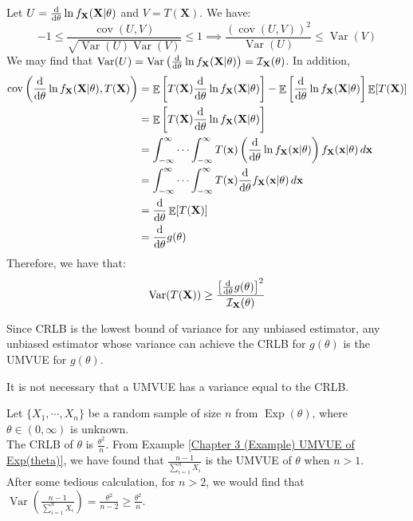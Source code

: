 \documentclass{huhtakm-template-book-v2}
\DeclareMathOperator{\E}{\mathbb{E}}
\DeclareMathOperator{\Var}{Var}
\DeclareMathOperator{\cov}{cov}
\DeclareMathOperator{\Exp}{Exp}
\begin{document}
\begin{proofing}
	Let $U=\odv*{\ln{f_{\mathbf{X}}(\mathbf{X}|\theta)}}{\theta}$ and $V=T(\mathbf{X})$. We have:
	\begin{equation*}
		-1\leq\frac{\cov(U,V)}{\sqrt{\Var(U)\Var(V)}}\leq 1\implies\frac{(\cov(U,V))^{2}}{\Var(U)}\leq\Var(V)
	\end{equation*}
	We may find that $\Var(U)=\Var\left(\odv*{\ln{f_{\mathbf{X}}(\mathbf{X}|\theta)}}{\theta}\right)=\mathcal{I}_{\mathbf{X}}(\theta)$. In addition,
	\begin{align*}
		\cov\left(\odv*{\ln{f_{\mathbf{X}}(\mathbf{X}|\theta)}}{\theta},T(\mathbf{X})\right)&=\E\left[T(\mathbf{X})\odv*{\ln{f_{\mathbf{X}}(\mathbf{X}|\theta)}}{\theta}\right]-\E\left[\odv*{\ln{f_{\mathbf{X}}(\mathbf{X}|\theta)}}{\theta}\right]\E[T(\mathbf{X})]\\
		&=\E\left[T(\mathbf{X})\odv*{\ln{f_{\mathbf{X}}(\mathbf{X}|\theta)}}{\theta}\right]\\
		&=\intinfty\cdots\intinfty T(\mathbf{x})\left(\odv*{\ln{f_{\mathbf{X}}(\mathbf{x}|\theta)}}{\theta}\right)f_{\mathbf{X}}(\mathbf{x}|\theta)\,d\mathbf{x}\\
		&=\intinfty\cdots\intinfty T(\mathbf{x})\odv*{f_{\mathbf{X}}(\mathbf{x}|\theta)}{\theta}\,d\mathbf{x}\\
		&=\odv*{\E[T(\mathbf{X})]}{\theta}\\
		&=\odv*{g(\theta)}{\theta}
	\end{align*}
	Therefore, we have that:
	\begin{equation*}
		\Var(T(\mathbf{X}))\geq\frac{\left[\odv*{g(\theta)}{\theta}\right]^{2}}{\mathcal{I}_{\mathbf{X}}(\theta)}
	\end{equation*}
\end{proofing}
\begin{rem}
	Since CRLB is the lowest bound of variance for any unbiased estimator, any unbiased estimator whose variance can achieve the CRLB for $g(\theta)$ is the UMVUE for $g(\theta)$.
\end{rem}
\begin{rem}
	It is not necessary that a UMVUE has a variance equal to the CRLB.
\end{rem}
\begin{eg}
	Let $\{X_{1},\cdots,X_{n}\}$ be a random sample of size $n$ from $\Exp(\theta)$, where $\theta\in(0,\infty)$ is unknown.\\
	The CRLB of $\theta$ is $\frac{\theta^{2}}{n}$. From Example \ref{Chapter 3 (Example) UMVUE of Exp(theta)}, we have found that $\frac{n-1}{\sum_{i=1}^{n}X_{i}}$ is the UMVUE of $\theta$ when $n>1$.\\
	After some tedious calculation, for $n>2$, we would find that $\Var\left(\frac{n-1}{\sum_{i=1}^{n}X_{i}}\right)=\frac{\theta^{2}}{n-2}\geq\frac{\theta^{2}}{n}$.
\end{eg}
\end{document}
